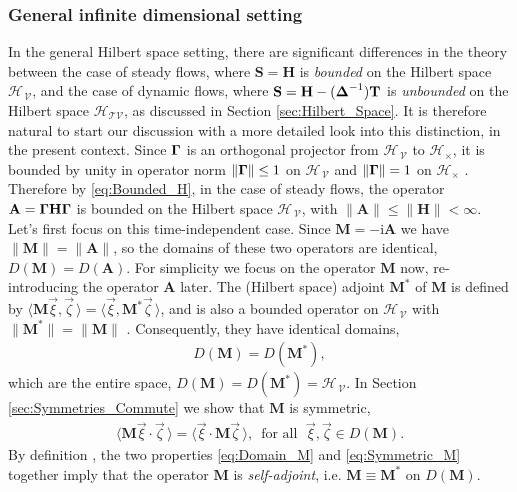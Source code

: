 \documentclass[11pt]{amsart}
\newcommand{\I}{\mathrm{i}}
\newcommand{\Mb}{\mathbf{M}}
\newcommand{\Tb}{\mathbf{T}}
\newcommand{\Hb}{\mathbf{H}}
\newcommand{\Sb}{\mathbf{S}}
\newcommand{\Ab}{\mathbf{A}}
\newcommand{\Tc}{\mathcal{T}}
\newcommand{\Vc}{\mathcal{V}}
\newcommand{\Hs}{\mathscr{H}}
\newcommand\bDelta{\mbox{\boldmath${\Delta}$}}
\newcommand\bGamma{\mbox{\boldmath${\Gamma}$}}
\begin{document}
\subsubsection{General infinite dimensional setting}\label{sec:Integral_Rep_General}
%
In the general Hilbert space setting, there are significant
differences in the theory between the case of steady flows, where
$\Sb=\Hb$ is \emph{bounded} on the Hilbert space $\Hs_{\,\Vc}$, and
the case of dynamic flows, where $\Sb=\Hb-(\bDelta^{-1})\Tb$ is
\emph{unbounded} on the Hilbert space $\Hs_{\Tc\Vc}$, as discussed in
Section \ref{sec:Hilbert_Space}. It is therefore natural to start our
discussion with a more detailed look into this distinction, in the
present context. Since $\bGamma$ is an orthogonal projector from
$\Hs_{\,\Vc}$ to $\Hs_\times$, it is bounded by unity in operator norm
$\|\bGamma\|\leq1$ on $\Hs_{\,\Vc}$ and $\|\bGamma\|=1$ on $\Hs_\times$
\cite{Reed-1980,Stone:64}. Therefore by \eqref{eq:Bounded_H}, in the
case of  steady flows, the operator $\Ab=\bGamma\Hb\bGamma$ is bounded
on the Hilbert space $\Hs_{\,\Vc}$, with $\|\Ab\|\leq\|\Hb\|<\infty$. Let's first
focus on this time-independent case. Since $\Mb=-\I\Ab$ we have 
$\|\Mb\|=\|\Ab\|$, so the domains of these two operators are identical,
$D(\Mb)=D(\Ab)$. For simplicity we focus on the operator $\Mb$ now,
re-introducing the operator $\Ab$ later. The (Hilbert space)
adjoint $\Mb^*$ of $\Mb$ is defined by
$\langle\Mb\vec{\xi},\vec{\zeta}\,\rangle=\langle\vec{\xi},\Mb^*\vec{\zeta}\,\rangle$, and is also a
bounded operator on $\Hs_{\,\Vc}$ with $\|\Mb^*\|=\|\Mb\|$
\cite{Reed-1980}. Consequently, they have identical domains,       
%
\begin{align}\label{eq:Domain_M}
  D(\Mb)=D(\Mb^*),
\end{align}
%
which are the entire space, $D(\Mb)=D(\Mb^*)=\Hs_{\,\Vc}$. In
Section \ref{sec:Symmetries_Commute} we show that $\Mb$ is symmetric,
%
\begin{align}\label{eq:Symmetric_M}
  \langle\Mb\vec{\xi}\cdot\vec{\zeta}\,\rangle=\langle\vec{\xi}\cdot\Mb\vec{\zeta}\,\rangle,
  \, \text{ for all } \; \vec{\xi},\vec{\zeta}\in D(\Mb).
\end{align}
%
By definition \cite{Reed-1980,Stone:64}, the two properties
\eqref{eq:Domain_M} and \eqref{eq:Symmetric_M} together imply that the
operator $\Mb$ is \emph{self-adjoint}, i.e. $\Mb\equiv\Mb^*$ on $D(\Mb)$.
\end{document}
